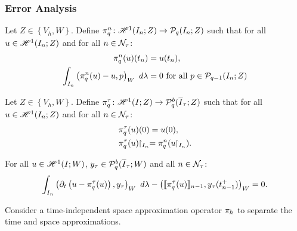 \subsubsection{Error Analysis}

\begin{definition}[$\InterpolantQN$]
    Let $Z \in \left\{V_h, W\right\}$. Define $\pi^n_q \colon \mathscr{H}^{1}(I_n; Z) \rightarrow \mathcal{P}_{q}(I_n; Z)$ such that for all $u \in \mathscr{H}^{1}(I_n; Z)$ and for all $n \in \mathcal{N}_{\tau}$:
    \begin{align}
        \pi^n_q(u)(t_n) & = u(t_n), \\
        \int_{I_n} \left( \pi^n_q(u) - u, p \right)_W ~ d \lambda & = 0 \text{ for all } p \in \mathcal{P}_{q - 1}(I_n; Z)
    \end{align}
\end{definition}

\begin{definition}[$\InterpolantQT$]
    Let $Z \in \left\{V_h, W\right\}$. Define $\pi^{\tau}_q \colon \mathscr{H}^{1}(I; Z) \rightarrow \mathcal{P}_{q}^b(\overline{I}_{\tau}; Z)$ such that for all $u \in \mathscr{H}^{1}(I_n; Z)$ and for all $n \in \mathcal{N}_{\tau}$:
    \begin{align}
        & \pi^{\tau}_q(u)(0) = u(0), \\
        & \pi^{\tau}_q(u) \!\!\restriction_{I_n} = \pi^n_q(u \!\!\restriction_{I_n}).
    \end{align}
\end{definition}

\begin{lemma}[Orthogonality]
    For all $u \in \mathscr{H}^{1}(I; W)$, $y_{\tau} \in \mathcal{P}_{q}^b(\overline{I}_{\tau}; W)$ and all $n \in \mathcal{N}_{\tau}$:
    \begin{gather}
        \int_{I_n} \left( \partial_t \left( u - \pi^{\tau}_q(u) \right), y_{\tau} \right)_W ~ d \lambda - \left( \llbracket \pi^{\tau}_q(u) \rrbracket_{n - 1}, y_{\tau}(t_{n - 1}^+) \right)_W = 0.
    \end{gather}
\end{lemma}

Consider a time-independent space approximation operator $\pi_h$ to separate the time and space approximations.


